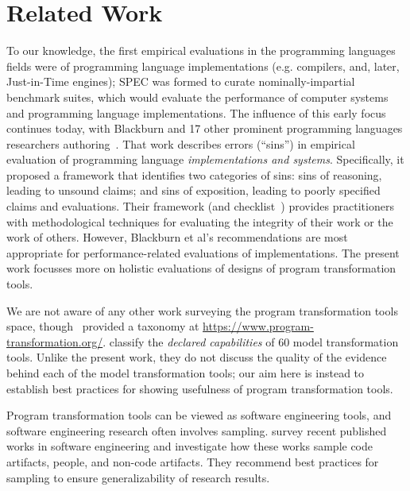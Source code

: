 \section{Related Work}
\label{sec:related}

To our knowledge, the first empirical evaluations in the programming
languages fields were of programming language implementations
(e.g. compilers, and, later, Just-in-Time engines); 
SPEC was formed to curate nominally-impartial benchmark suites,
which would evaluate the performance of
computer systems and programming language implementations. 
The influence of this early focus continues
today, with Blackburn and 17 other prominent programming languages
researchers
authoring~\cite{blackburn16:_truth_whole_truth_nothin_but_truth}. That
work describes errors (``sins'') in empirical evaluation of programming
language \emph{implementations and systems}.  Specifically, it proposed a
framework that identifies two categories of sins: sins of reasoning,
leading to unsound claims; and sins of exposition, leading to poorly
specified claims and evaluations. Their framework (and 
checklist~\cite{berger19:_check_manif_empir_evaluat}) provides
practitioners with methodological techniques for evaluating the
integrity of their work or the work of others.  However, Blackburn et al's
recommendations are most appropriate for
performance-related evaluations of implementations. 
The present work focusses more on holistic
evaluations of designs of program transformation tools.

We are not aware of any other work surveying the program
transformation tools space, though~
provided a taxonomy at \url{https://www.program-transformation.org/}.
 classify the
\emph{declared capabilities} of 60 model transformation tools. Unlike
the present work, they do not discuss the quality of the evidence
behind each of the model transformation tools; our aim here is instead
to establish best practices for showing usefulness of program
transformation tools.

Program transformation tools can be viewed as software engineering
tools, and software engineering research often involves sampling. 
 survey recent
published works in software engineering and investigate how these works sample code
artifacts, people, and non-code artifacts.  They recommend best
practices for sampling to ensure generalizability of research results.

